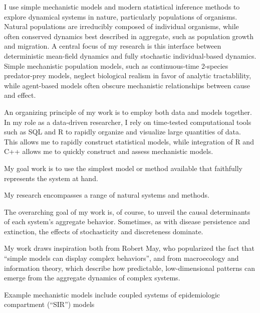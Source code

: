 \documentclass[12pt]{article}
\author{Christian Gunning}
\title{}
\date{\today}
\begin{document}
I use simple mechanistic models and modern statistical inference 
methods to explore dynamical systems in nature, particularly 
populations of organisms. 
Natural populations are irreducibly composed of 
individual organisms, while often conserved dynamics best 
described in aggregate, such as population growth and migration.  
A central focus of my 
research is this interface between deterministic
mean-field dynamics and fully stochastic individual-based dynamics.  
Simple mechanistic population models, such as continuous-time 2-species 
predator-prey models, neglect biological realism in favor of 
analytic tractablility, while agent-based models often   
obscure mechanistic relationships between cause and effect.

An organizing principle of my work is to employ both data and models 
together. In my role as a data-driven researcher, I rely on time-tested
computational tools such as SQL and R to rapidly organize and visualize
large quantities of data.  This allows me to rapidly construct statistical
models, while integration of R and C++ allows me to quickly construct and 
assess mechanistic models.  

My goal work is to use the simplest model or method available that 
faithfully represents the system at hand.  

My research encompasses a range of natural systems and methods.  

The overarching goal of my work is, of course, to unveil the causal 
determinants of each system's aggregate behavior.  Sometimes, as 
with disease persistence and extinction, the 
effects of stochasticity and discreteness dominate.

My work draws inspiration both from Robert May, who popularized  
the fact that ``simple models can display complex behaviors'', 
and from macroecology and information theory, which describe how 
predictable, low-dimensional patterns can emerge from the 
aggregate dynamics of complex systems.  

Example mechanistic models include coupled 
systems of epidemiologic compartment (``SIR'') models





\section{}

%
%
\end{document}
